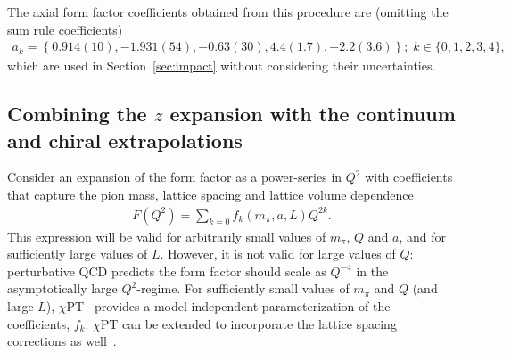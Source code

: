 \documentclass{ar-1col}
\begin{document}
The axial form factor coefficients obtained from this procedure are
 (omitting the sum rule coefficients)
\begin{align}
 a_k = \left\{ 0.914(10), -1.931(54), -0.63(30), 4.4(1.7), -2.2(3.6) \right\};
 \; k \in \{0,1,2,3,4\},
\end{align}
which are used in Section~\ref{sec:impact} without considering their uncertainties.

\subsection{Combining the $z$ expansion with the continuum and chiral extrapolations\label{sec:z_continuum}}

Consider an expansion of the form factor as a power-series in $Q^2$ with coefficients that capture the pion mass, lattice spacing and lattice volume dependence
\begin{align}\label{eq:F_Q_power}
F(Q^2) = \sum_{k=0} f_k(m_\pi, a, L) Q^{2k}.
\end{align}
This expression will be valid for arbitrarily small values of $m_\pi$, $Q$ and $a$, and for sufficiently large values of $L$.
However, it is not valid for large values of $Q$: perturbative QCD predicts the form factor should scale as $Q^{-4}$ in the asymptotically large $Q^2$-regime.
For sufficiently small values of $m_\pi$ and $Q$ (and large $L$), $\chi$PT~\cite{Gasser:1984gg,Jenkins:1990jv,Bernard:1995dp} provides a model independent parameterization of the coefficients, $f_k$.  $\chi$PT can be extended to incorporate the lattice spacing corrections as well~\cite{Sharpe:1998xm}.
\end{document}
